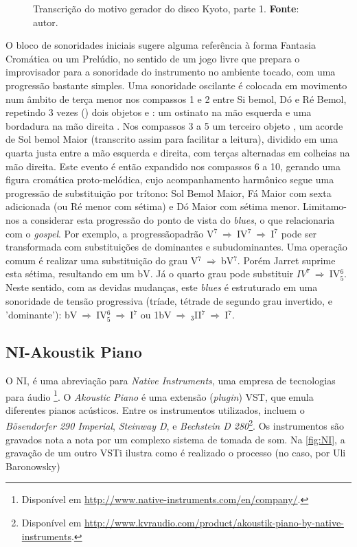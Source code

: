 \begin{figure}[!h]
  \centering
  
  \caption{Transcrição do motivo gerador do disco Kyoto, parte 1. \textbf{Fonte}: autor.}
  \label{fig:Jarret_intro}
\end{figure}

O bloco de sonoridades iniciais  sugere alguma referência à forma Fantasia Cromática ou um Prelúdio, no sentido de um jogo livre que prepara o improvisador para a sonoridade do instrumento no ambiente tocado, com uma progressão bastante simples.  Uma sonoridade oscilante é colocada em movimento num âmbito de terça menor nos compassos 1 e 2 entre Si bemol, Dó e Ré Bemol, repetindo 3 vezes () dois objetos  e : um ostinato na mão esquerda e uma bordadura na mão direita . Nos compassos 3 a 5 um terceiro objeto , um acorde de Sol bemol Maior (transcrito assim para facilitar a leitura), dividido em uma quarta justa entre a mão esquerda e direita, com terças alternadas em colheias na mão direita. Este evento é então expandido nos compassos 6 a 10, gerando uma figura cromática proto-melódica, cujo acompanhamento harmônico segue uma progressão de substituição por trítono: Sol Bemol Maior, Fá Maior com sexta adicionada (ou Ré menor com sétima) e Dó Maior com sétima menor. Limitamo-nos a considerar esta progressão do ponto de vista do \emph{blues}, o que relacionaria com o \emph{gospel}. Por exemplo, a progressãopadrão  V$^7~\Rightarrow~$IV$^7~\Rightarrow~$I$^7$ pode ser transformada com substituições de dominantes e subudominantes. Uma operação comum é realizar uma substituição do grau V$^7~\Rightarrow~$bV$^7$. Porém Jarret suprime esta sétima, resultando em um bV. Já o quarto grau pode substituir  $IV^7~\Rightarrow~$IV$^6_5$. Neste sentido, com as devidas mudanças, este \emph{blues} é estruturado em uma sonoridade de tensão progressiva (tríade, tétrade de segundo grau invertido, e 'dominante'):  bV$~\Rightarrow~$IV$^6_5~\Rightarrow~$I$^7$ ou 1bV$~\Rightarrow~_3$II$^7~\Rightarrow~$I$^7$. 

\subsection{NI-Akoustik Piano}\label{sec:NI}

O NI, é uma abreviação para \emph{Native Instruments}, uma empresa de tecnologias para áudio \footnote{Disponível em \url{http://www.native-instruments.com/en/company/}.}. O \emph{Akoustic Piano} é uma extensão (\emph{plugin}) VST, que emula diferentes pianos acústicos. Entre os instrumentos utilizados, incluem o \emph{Bösendorfer 290 Imperial}, \emph{Steinway D}, e \emph{Bechstein D 280}\footnote{Disponível em \url{http://www.kvraudio.com/product/akoustik-piano-by-native-instruments}.}. Os instrumentos são gravados nota a nota por um complexo sistema de tomada de som. Na \autoref{fig:NI}, a gravação de um outro VSTi ilustra como é realizado o processo (no caso, por Uli Baronowsky)

